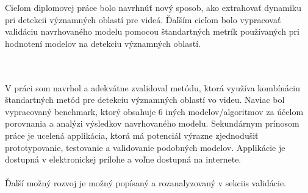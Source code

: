 Cieľom diplomovej práce bolo navrhnúť nový sposob, ako extrahovať dynamiku pri detekcii významných oblastí pre videá.
Ďaľším cieľom bolo vypracovať validáciu navrhovaného modelu pomocou štandartných metrík používaných pri hodnotení modelov na detekciu významných oblastí.

\\\\
V práci som navrhol a adekvátne zvalidoval metódu, ktorá využíva kombínáciu štandartných metód pre detekciu významných oblastí vo videu.
Naviac bol vypracovaný benchmark, ktorý obsahuje 6 iných modelov/algoritmov za účelom porovnania a analýzi výsledkov navrhovaného modelu.
Sekundárnym prínosom práce je ucelená applikácia, ktorá má potenciál výrazne zjednodušiť prototypovanie, testovanie a validovanie podobných modelov.
Applikácie je dostupná v elektronickej prílohe a voľne dostupná na internete.
\\\\
Ďalší možný rozvoj je možný popísaný a rozanalyzovaný v sekciis validácie.

